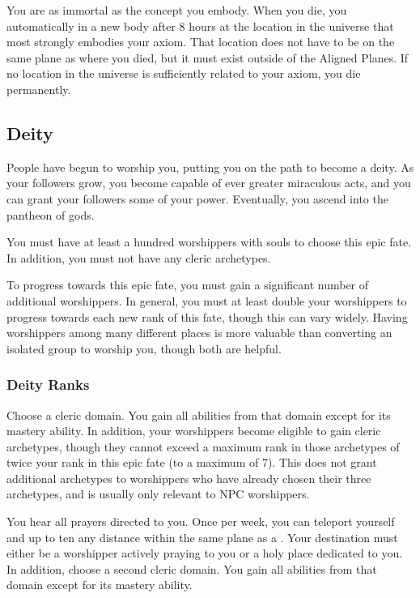      You are as immortal as the concept you embody.
    When you die, you automatically  in a new body after 8 hours at the location in the universe that most strongly embodies your axiom.
    That location does not have to be on the same plane as where you died, but it must exist outside of the Aligned Planes.
    If no location in the universe is sufficiently related to your axiom, you die permanently.

  \subsection{Deity}
    People have begun to worship you, putting you on the path to become a deity.
    As your followers grow, you become capable of ever greater miraculous acts, and you can grant your followers some of your power.
    Eventually, you ascend into the pantheon of gods.

     You must have at least a hundred worshippers with souls to choose this epic fate.
    In addition, you must not have any cleric archetypes.

     To progress towards this epic fate, you must gain a significant number of additional worshippers.
    In general, you must at least double your worshippers to progress towards each new rank of this fate, though this can vary widely.
    Having worshippers among many different places is more valuable than converting an isolated group to worship you, though both are helpful.

    \subsubsection{Deity Ranks}
       Choose a cleric domain.
      You gain all abilities from that domain except for its mastery ability.
      In addition, your worshippers become eligible to gain cleric archetypes, though they cannot exceed a maximum rank in those archetypes of twice your rank in this epic fate (to a maximum of 7).
      This does not grant additional archetypes to worshippers who have already chosen their three archetypes, and is usually only relevant to NPC worshippers.

       You hear all prayers directed to you.
      Once per week, you can teleport yourself and up to ten  any distance within the same plane as a .
      Your destination must either be a worshipper actively praying to you or a holy place dedicated to you.
      In addition, choose a second cleric domain.
      You gain all abilities from that domain except for its mastery ability.

